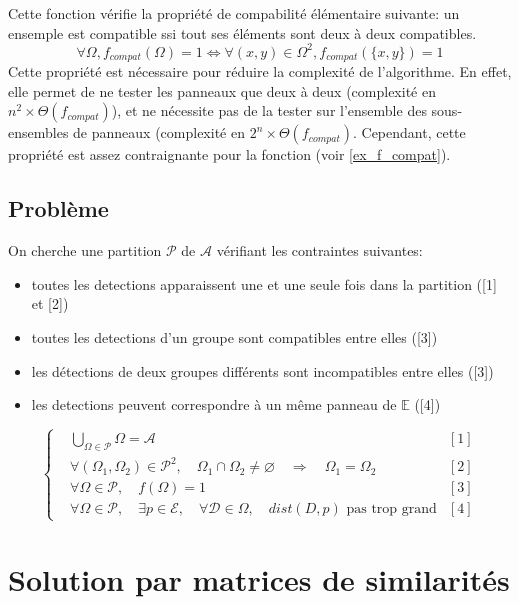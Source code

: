 \documentclass{article}
\begin{document}
Cette fonction vérifie la propriété de compabilité élémentaire suivante: un ensemple est compatible ssi tout ses éléments sont deux à deux compatibles. 
\[
\forall \Omega, f_{compat}(\Omega)=1 \Longleftrightarrow \forall (x,y) \in \Omega^{2}, f_{compat}(\{x, y\})=1
\]
Cette propriété est nécessaire pour réduire la complexité de l'algorithme. En effet, elle permet de ne tester les panneaux que deux à deux (complexité en \(n^{2} \times \Theta(f_{compat})\)), et ne nécessite pas de la tester sur l'ensemble des sous-ensembles de panneaux (complexité en \(2^{n} \times \Theta(f_{compat})\). Cependant, cette propriété est assez contraignante pour la fonction (voir \ref{ex_f_compat}).


\subsection{Problème}
On cherche une partition \(\mathscr{P}\) de \(\mathscr{A}\) vérifiant les contraintes suivantes:
\begin{itemize}
\item toutes les detections apparaissent une et une seule fois dans la partition ([1] et [2])
\item toutes les detections d'un groupe sont compatibles entre elles ([3])
\item les détections de deux groupes différents sont incompatibles entre elles ([3])
\item les detections peuvent correspondre à un même panneau de \(\mathbb{E}\) ([4])
\end{itemize}
\[
\left\{
\begin{aligned}
	&	\bigcup\limits_{\Omega \in \mathscr{P}}\Omega = \mathscr{A}	& [1]	\\
	&	\forall (\Omega_{1}, \Omega_{2}) \in \mathscr{P}^{2}, \quad \Omega_{1} \cap \Omega_{2} \neq \varnothing \quad \Longrightarrow \quad \Omega_{1} = \Omega_{2}			& [2]	\\
	&	\forall \Omega \in \mathscr{P}, \quad f(\Omega) = 1		& [3]	\\
	&	\forall \Omega \in \mathscr{P}, \quad \exists p \in \mathscr{E}, \quad \forall \mathscr{D} \in \Omega, \quad dist(D, p) \text{ pas trop grand}	& [4]
\end{aligned}
\right.
\]


\section{Solution par matrices de similarités}
\end{document}
